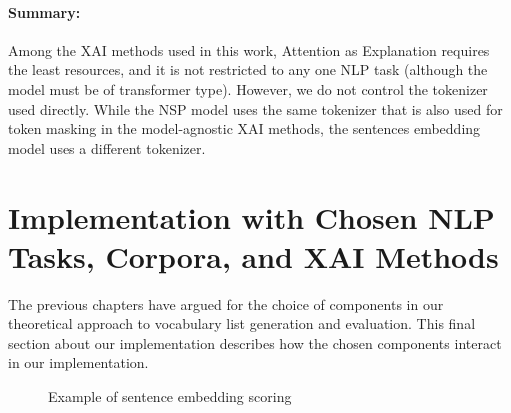 \paragraph{Summary:}
Among the XAI methods used in this work, Attention as Explanation requires the least resources, and it is not restricted to any one NLP task (although the model must be of transformer type).
However, we do not control the tokenizer used directly.
While the NSP model uses the same tokenizer that is also used for token masking in the model-agnostic XAI methods, the sentences embedding model uses a different tokenizer.



%
%
\section{Implementation with Chosen NLP Tasks, Corpora, and XAI Methods} \label{sec:implementation-final}
The previous chapters have argued for the choice of components in our theoretical approach to vocabulary list generation and evaluation.
This final section about our implementation describes how the chosen components interact in our implementation.


\begin{figure}[H]
	
	\caption{Example of sentence embedding scoring}
	\label{fig:list-evaluation-diagram}
\end{figure}

